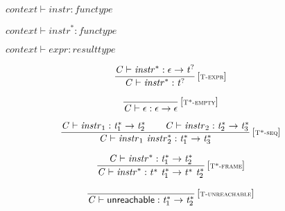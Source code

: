 \vspace{1ex}

$\boxed{{\mathit{context}} \vdash {\mathit{instr}} : {\mathit{functype}}}$

$\boxed{{\mathit{context}} \vdash {{\mathit{instr}}^\ast} : {\mathit{functype}}}$

$\boxed{{\mathit{context}} \vdash {\mathit{expr}} : {\mathit{resulttype}}}$

\vspace{1ex}

$$
\begin{array}{@{}c@{}}\displaystyle
\frac{
{\mathit{C}} \vdash {{\mathit{instr}}^\ast} : \epsilon \rightarrow {{\mathit{t}}^?}
}{
{\mathit{C}} \vdash {{\mathit{instr}}^\ast} : {{\mathit{t}}^?}
} \, {[\textsc{\scriptsize T{-}expr}]}
\qquad
\end{array}
$$

\vspace{1ex}

$$
\begin{array}{@{}c@{}}\displaystyle
\frac{
}{
{\mathit{C}} \vdash \epsilon : \epsilon \rightarrow \epsilon
} \, {[\textsc{\scriptsize T*{-}empty}]}
\qquad
\end{array}
$$

$$
\begin{array}{@{}c@{}}\displaystyle
\frac{
{\mathit{C}} \vdash {\mathit{instr}}_{{1}} : {{\mathit{t}}_{{1}}^\ast} \rightarrow {{\mathit{t}}_{{2}}^\ast}
 \qquad
{\mathit{C}} \vdash {\mathit{instr}}_{{2}} : {{\mathit{t}}_{{2}}^\ast} \rightarrow {{\mathit{t}}_{{3}}^\ast}
}{
{\mathit{C}} \vdash {\mathit{instr}}_{{1}}~{{\mathit{instr}}_{{2}}^\ast} : {{\mathit{t}}_{{1}}^\ast} \rightarrow {{\mathit{t}}_{{3}}^\ast}
} \, {[\textsc{\scriptsize T*{-}seq}]}
\qquad
\end{array}
$$

$$
\begin{array}{@{}c@{}}\displaystyle
\frac{
{\mathit{C}} \vdash {{\mathit{instr}}^\ast} : {{\mathit{t}}_{{1}}^\ast} \rightarrow {{\mathit{t}}_{{2}}^\ast}
}{
{\mathit{C}} \vdash {{\mathit{instr}}^\ast} : {{\mathit{t}}^\ast}~{{\mathit{t}}_{{1}}^\ast} \rightarrow {{\mathit{t}}^\ast}~{{\mathit{t}}_{{2}}^\ast}
} \, {[\textsc{\scriptsize T*{-}frame}]}
\qquad
\end{array}
$$

\vspace{1ex}

$$
\begin{array}{@{}c@{}}\displaystyle
\frac{
}{
{\mathit{C}} \vdash \mathsf{unreachable} : {{\mathit{t}}_{{1}}^\ast} \rightarrow {{\mathit{t}}_{{2}}^\ast}
} \, {[\textsc{\scriptsize T{-}unreachable}]}
\qquad
\end{array}
$$

